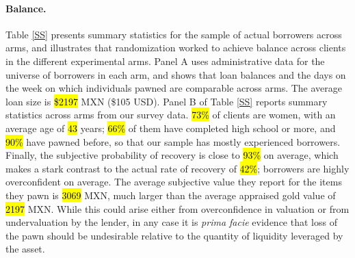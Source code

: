 \documentclass[oneside,11pt]{article}
\begin{document}
   

    
\paragraph{Balance.} Table \ref{SS} presents summary statistics for the sample of actual borrowers across arms, and illustrates that randomization worked to achieve balance across clients in the different experimental arms. Panel A uses administrative data for the universe of borrowers in each arm, and shows that loan balances and the days on the week on which individuals pawned are comparable across arms. The average loan size is \hl{\$2197} MXN (\$105 USD). Panel B of Table \ref{SS} reports summary statistics across arms from our survey data. \hl{73\%} of clients are women, with an average age of \hl{43} years; \hl{66\%} of them have completed high school or more, and \hl{90\%} have pawned before, so that our sample has mostly experienced borrowers. Finally, the subjective probability of recovery is close to \hl{93\%} on average, which makes a stark contrast to the actual rate of recovery of \hl{42\%}; borrowers are highly overconfident on average. The average subjective value they report for the items they pawn is \hl{3069} MXN, much larger than the average appraised gold value of \hl{2197} MXN. While this could arise either from overconfidence in valuation or from undervaluation by the lender, in any case it is \textit{prima facie} evidence that loss of the pawn should be undesirable relative to the quantity of liquidity leveraged by the asset. 
\end{document}

